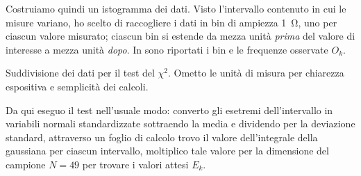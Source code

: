             Costruiamo quindi un istogramma dei dati. Visto l'intervallo contenuto in cui le misure variano, ho scelto di raccogliere i dati in bin di ampiezza \SI{1}{\ohm}, uno per ciascun valore misurato; ciascun bin si estende da mezza unità \emph{prima} del valore di interesse a mezza unità \emph{dopo}. In  sono riportati i bin e le frequenze osservate $O_k$.
            \begin{table}
                \centering
                
                \caption{Suddivisione dei dati per il test del $\chi^2$. Ometto le unità di misura per chiarezza espositiva e semplicità dei calcoli.}
                \label{tab:mul:bin-istogramma}
            \end{table}

            Da qui eseguo il test nell'usuale modo: converto gli esetremi dell'intervallo in variabili normali standardizzate sottraendo la media e dividendo per la deviazione standard, attraverso un foglio di calcolo trovo il valore dell'integrale della gaussiana per ciascun intervallo, moltiplico tale valore per la dimensione del campione $N = 49$ per trovare i valori attesi $E_k$.